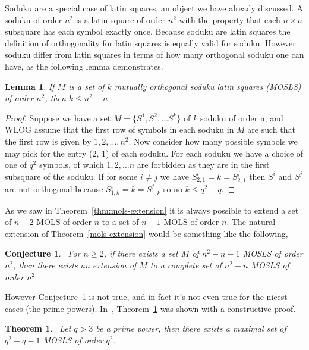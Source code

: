 \documentclass{article}
\newtheorem{lemma}{Lemma}
\newtheorem{theorem}{Theorem}
\newtheorem{conjecture}{Conjecture}
\begin{document}
Soduku are a special case of latin squares, an object we have already discussed. A soduku of order \(n^{2}\) is a latin square of order \(n^{2}\)  with the property that each \(n \times n\) subsquare has each symbol exactly once.
Because soduku are latin squares the definition of orthogonality for latin squares is equally valid for soduku. However soduku differ from latin squares in terms of how many orthogonal soduku one can have, as the following lemma demonstrates.

\begin{lemma}\label{lemma:orth-soduku}
If \(M\) is a set of \(k\) mutually orthogonal soduku latin squares (MOSLS) of order \(n^{2}\), then \(k \leq n^{2} - n\)
\end{lemma}

\begin{proof}
Suppose we have a set \(M = \{S^{1}, S^{2}, \ldots S^{k}\}\) of \(k\) soduku of order n, and WLOG assume that the first row of symbols in each soduku in \(M\) are such that the first row is given by \(1, 2, \ldots, n^{2}\). Now consider how many possible symbols we may pick for the entry (2, 1) of each soduku. For each soduku we have a choice of one of \(q^{2}\) symbols, of which \(1, 2, \ldots n\) are forbidden as they are in the first subsquare of the soduku. If for some \(i \ne j\) we have \(S^{i}_{2, 1} = k =  S^{j}_{2, 1}\) then \(S^{i}\) and \(S^{j}\) are not orthogonal because \(S^{i}_{1, k} = k = S^{j}_{1, k}\) so no \(k \leq q^{2} - q\).
\end{proof}

As we saw in Theorem~\ref{thm:mols-extension} it is always possible to extend a set of \(n - 2\) MOLS of order \(n\) to a set of \(n - 1\) MOLS of order \(n\). The natural extension of Theorem~\ref{mols-extension} would be something like the following,

\begin{conjecture}~\label{conj:mosls-ortho}
For \(n \geq 2\), if there exists a set \(M\) of \(n^{2} - n - 1\) MOSLS of order \(n^{2}\), then there exists an extension of \(M\) to a complete set of \(n^{2} - n\) MOSLS of order \(n^{2}\)
\end{conjecture}

However Conjecture~\ref{conj:mosls-ortho} is not true, and in fact it's not even true for the nicest cases (the prime powers). In~\cite{Dhaeseleer2017}, Theorem~\ref{thm:mosls-extension} was shown with a constructive proof.

\begin{theorem}~\label{thm:mosls-extension}
Let \(q > 3\) be a prime power, then there exists a maximal set of \(q^{2} - q - 1\) MOSLS of order \(q^{2}\).
\end{theorem}
\end{document}
